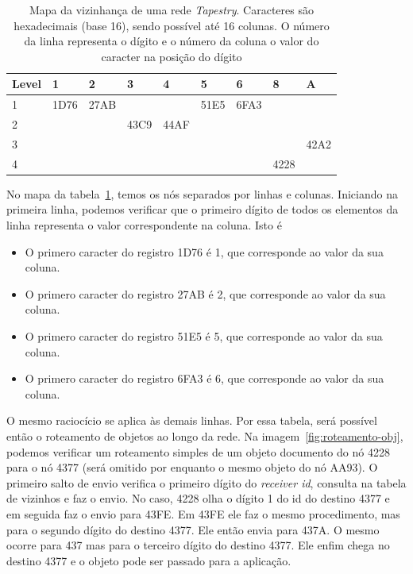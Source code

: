 \begin{table}
	\begin{tabular}{|p{2cm} |p{1cm} |p{1cm} |p{1cm} |p{1cm} |p{1cm} |p{1cm} |p{1cm} |p{1cm}|}
		\hline
		\textbf{Level}	& \textbf{1} & \textbf{2} & \textbf{3}  & \textbf{4}  & \textbf{5}  & \textbf{6} & \textbf{8} & \textbf{A}	\\
		\hline
				1 		& 1D76 		 & 27AB 	  &  			&  			  &		51E5	&	6FA3	 &			  &	            \\
		\hline
				2 		& 	 		 & 		 	  &  43C9		&  	44AF	  &				&			 &			  &	            \\
		\hline
				3 		& 	 		 & 		 	  &  			&  			  &				&			 &			  &	   42A2     \\
		\hline
				4 		& 	 		 & 			  &  			&  			  &				&			 &		4228  &	            \\
		\hline
	\end{tabular}
	\caption{Mapa da vizinhança de uma rede \emph{Tapestry}. Caracteres são hexadecimais (base 16), sendo possível até 16 colunas. O número da linha representa o dígito e o número da coluna o valor do caracter na posição do dígito}
	\label{mapa_vizinhaca_tapestry}
\end{table}

No mapa da tabela~\ref{mapa_vizinhaca_tapestry}, temos os nós separados por linhas e colunas. Iniciando na primeira linha, podemos verificar que o primeiro dígito de todos os elementos da linha representa o valor correspondente na coluna. Isto é
\begin{itemize}
	\item O primero caracter do registro 1D76 é 1, que corresponde ao valor da sua coluna.
	\item O primero caracter do registro 27AB é 2, que corresponde ao valor da sua coluna.
	\item O primero caracter do registro 51E5 é 5, que corresponde ao valor da sua coluna.
	\item O primero caracter do registro 6FA3 é 6, que corresponde ao valor da sua coluna.
\end{itemize}

O mesmo raciocício se aplica às demais linhas. Por essa tabela, será possível então o roteamento de objetos ao longo da rede. Na imagem~\ref{fig:roteamento-obj}, podemos verificar um roteamento simples de um objeto documento do nó 4228 para o nó 4377 (será omitido por enquanto o mesmo objeto do nó AA93). O primeiro salto de envio verifica o primeiro dígito do \emph{receiver id}, consulta na tabela de vizinhos e faz o envio. No caso, 4228 olha o dígito 1 do id do destino 4377 e em seguida faz o envio para 43FE. Em 43FE ele faz o mesmo procedimento, mas para o segundo dígito do destino 4377. Ele então envia para 437A. O mesmo ocorre para 437 mas para o terceiro dígito do destino 4377. Ele enfim chega no destino 4377 e o objeto pode ser passado para a aplicação.

